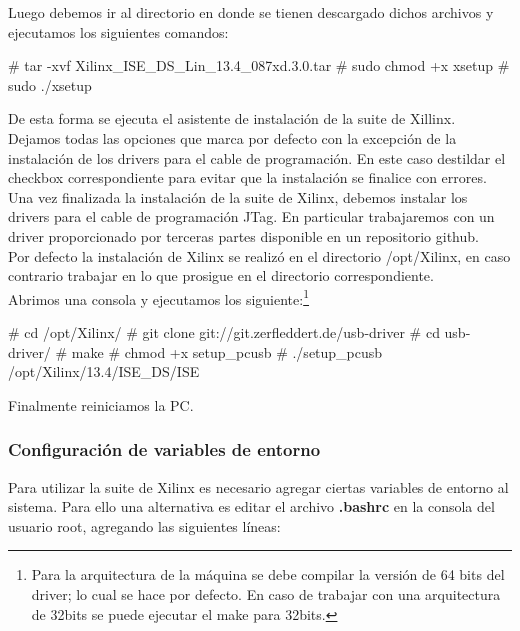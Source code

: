 Luego debemos ir al directorio en donde se tienen descargado dichos archivos y ejecutamos los siguientes comandos:

\begin{bash}
# tar -xvf Xilinx_ISE_DS_Lin_13.4_087xd.3.0.tar
# sudo chmod +x xsetup
# sudo ./xsetup
\end{bash}

De esta forma se ejecuta el asistente de instalación de la suite de Xillinx.\\

Dejamos todas las opciones que marca por defecto con la excepción de la instalación de los drivers para el cable de programación. En este caso destildar el checkbox correspondiente para evitar que la instalación se finalice con errores.\\

Una vez finalizada la instalación de la suite de Xilinx, debemos instalar los drivers para el cable de programación JTag. En particular trabajaremos con un driver proporcionado por terceras partes disponible en un repositorio github.\\

Por defecto la instalación de Xilinx se realizó en el directorio /opt/Xilinx, en caso contrario trabajar en lo que prosigue en el directorio correspondiente.\\

Abrimos una consola y ejecutamos los siguiente:\footnote{Para la arquitectura de la máquina se debe compilar la versión de 64 bits del driver; lo cual se hace por defecto. En caso de trabajar con una arquitectura de 32bits se puede ejecutar el make para 32bits.}\\

\begin{bash}
# cd /opt/Xilinx/
# git clone git://git.zerfleddert.de/usb-driver
# cd usb-driver/
# make
# chmod +x setup_pcusb
# ./setup_pcusb /opt/Xilinx/13.4/ISE_DS/ISE
\end{bash}

Finalmente reiniciamos la PC.

\subsubsection{Configuración de variables de entorno}
Para utilizar la suite de Xilinx es necesario agregar ciertas variables de entorno al sistema. Para ello una alternativa es editar el archivo \textbf{.bashrc} en la consola del usuario root, agregando las siguientes líneas:\\

